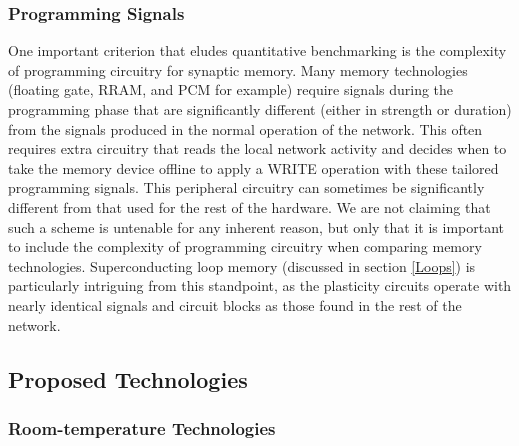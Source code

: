 \documentclass[twocolumn]{article}
\begin{document}
\subsubsection{Programming Signals}
One important criterion that eludes quantitative benchmarking is the complexity of programming circuitry for synaptic memory. Many memory technologies (floating gate, RRAM, and PCM for example) require signals during the programming phase that are significantly different (either in strength or duration) from the signals produced in the normal operation of the network. This often requires extra circuitry that reads the local network activity and decides when to take the memory device offline to apply a WRITE operation with these tailored programming signals. This peripheral circuitry can sometimes be significantly different from that used for the rest of the hardware. We are not claiming that such a scheme is untenable for any inherent reason, but only that it is important to include the complexity of programming circuitry when comparing memory technologies. Superconducting loop memory (discussed in section \ref{Loops}) is particularly intriguing from this standpoint, as the plasticity circuits operate with  nearly identical signals and circuit blocks as those found in the rest of the network.

\subsection{Proposed Technologies}\label{Proposed}
\subsubsection{Room-temperature Technologies}
\end{document}
